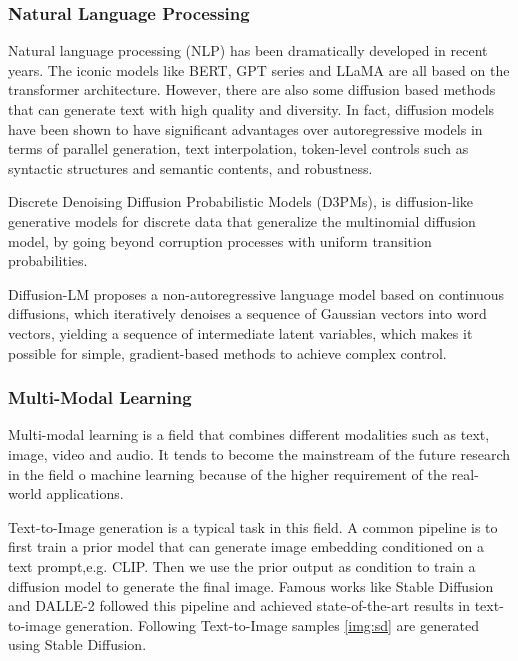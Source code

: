 \documentclass[12pt,DIV14,BCOR12mm,a4paper,footinclude=false,headinclude,parskip=half-,twoside,openright,cleardoublepage=empty,toc=index,bibliography=totoc,listof=totoc]{scrreprt}
\numberwithin{equation}{chapter}
\begin{document}
\subsubsection{Natural Language Processing}
Natural language processing (NLP) has been dramatically developed in recent years. The iconic models like BERT\cite{devlin2019bert}, GPT series\cite{Radford2018ImprovingLU} and LLaMA\cite{touvron2023llama} are all based on the transformer architecture. However, there are also some diffusion based methods that can generate text with high quality and diversity. In fact, diffusion models have been shown to have significant advantages over autoregressive models in terms of parallel generation, text interpolation, token-level controls such as syntactic structures and semantic contents, and robustness\cite{zou2023survey}.

Discrete Denoising Diffusion Probabilistic Models (D3PMs)\cite{austin2023structured}, is diffusion-like generative models for discrete data that generalize the multinomial diffusion model\cite{hoogeboom2021argmax}, by going beyond corruption processes with uniform transition probabilities. 

Diffusion-LM\cite{li2022diffusionlm} proposes a non-autoregressive language model based on continuous diffusions, which iteratively denoises a sequence of Gaussian vectors into word vectors, yielding a sequence of intermediate latent variables, which makes it possible for simple, gradient-based methods to achieve complex control.
\subsubsection{Multi-Modal Learning}
Multi-modal learning is a field that combines different modalities such as text, image, video and audio. It tends to become the mainstream of the future research in the field o machine learning because of the higher requirement of the real-world applications.

Text-to-Image generation is a typical task in this field. A common pipeline is to first train a prior model that can generate image embedding conditioned on a text prompt,e.g. CLIP\cite{radford2021learning}. Then we use the prior output as condition to train a diffusion model to generate the final image. Famous works like Stable Diffusion\cite{rombach2022highresolution} and DALLE-2\cite{ramesh2022hierarchical} followed this pipeline and achieved state-of-the-art results in text-to-image generation. Following Text-to-Image samples \ref{img:sd} are generated using Stable Diffusion.
\end{document}
